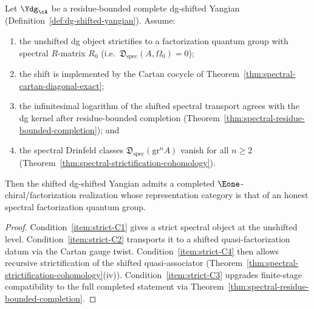 \begin{theorem}
\label{thm:spectral-conditional-strictification}
Let $\Ydg_\cA$ be a residue-bounded complete dg-shifted Yangian
\textup{(}Definition~\textup{\ref{def:dg-shifted-yangian}}\textup{)}.
Assume:
\begin{enumerate}[label=\textup{(C\arabic*)}]
\item\label{item:strict-C1}
 the unshifted dg object strictifies to a factorization quantum
 group with spectral $R$-matrix $R_0$
 \textup{(}i.e.\ $\mathfrak{D}_{\mathrm{spec}}(A, \Omega_0)
 = 0$\textup{)};
\item\label{item:strict-C2}
 the shift is implemented by the Cartan cocycle of
 Theorem~\textup{\ref{thm:spectral-cartan-diagonal-exact}};
\item\label{item:strict-C3}
 the infinitesimal logarithm of the shifted spectral transport
 agrees with the dg kernel after residue-bounded completion
 \textup{(}Theorem~\textup{\ref{thm:spectral-residue-bounded-completion}}\textup{)}; and
\item\label{item:strict-C4}
 the spectral Drinfeld classes
 $\mathfrak{D}_{\mathrm{spec}}(\mathrm{gr}^n A)$ vanish for
 all $n \ge 2$
 \textup{(}Theorem~\textup{\ref{thm:spectral-strictification-cohomology}}\textup{)}.
\end{enumerate}
Then the shifted dg-shifted Yangian admits a completed
$\Eone$-chiral/factorization realization whose representation
category is that of an honest spectral factorization quantum
group.
\end{theorem}

\begin{proof}
Condition~\ref{item:strict-C1} gives a strict spectral object
at the unshifted level.
Condition~\ref{item:strict-C2} transports it to a shifted
quasi-factorization datum via the Cartan gauge twist.
Condition~\ref{item:strict-C4} then allows recursive
strictification of the shifted quasi-associator
(Theorem~\ref{thm:spectral-strictification-cohomology}(iv)).
Condition~\ref{item:strict-C3} upgrades finite-stage compatibility
to the full completed statement via
Theorem~\ref{thm:spectral-residue-bounded-completion}.
\end{proof}

